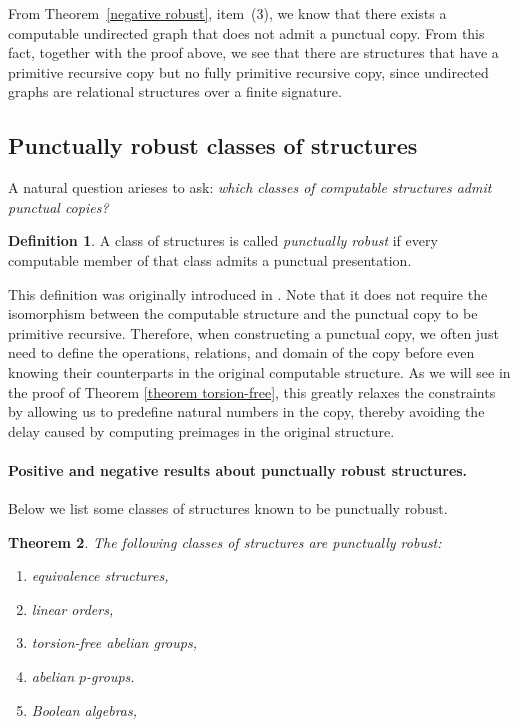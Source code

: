 \documentclass{pracalicmgr2025}
\theoremstyle{plain}            %
\newtheorem{theorem}{Theorem}[chapter]
\theoremstyle{remark}           %
\theoremstyle{definition}       %
\newtheorem{definition}[theorem]{Definition}
\begin{document}
From Theorem~\ref{negative robust}, item~(3), we know that there exists a computable undirected graph that does not admit a punctual copy. From this fact, together with the proof above, we see that there are structures that have a primitive recursive copy but no fully primitive recursive copy, since undirected graphs are relational structures over a finite signature.



\subsection{Punctually robust classes of structures}

A natural question arieses to ask: \emph{which classes of computable structures admit punctual copies?}
\begin{definition}
A class of structures is called \textit{punctually robust} if every computable member of that class admits a punctual presentation.
\end{definition}
This definition was originally introduced in \cite{kalocinski_et_al:LIPIcs.MFCS.2024.65}. Note that it does not require the isomorphism between the computable structure and the punctual copy to be primitive recursive. Therefore, when constructing a punctual copy, we often just need to define the operations, relations, and domain of the copy before even knowing their counterparts in the original computable structure. As we will see in the proof of Theorem \ref{theorem torsion-free}, this greatly relaxes the constraints by allowing us to predefine natural numbers in the copy, thereby avoiding the delay caused by computing preimages in the original structure.



\newpage
\paragraph{Positive and negative results about punctually robust structures.}
Below we list some classes of structures known to be punctually robust. 



\begin{theorem}\cite{3}\label{positive robust}
The following classes of structures are punctually robust:
\begin{enumerate}[noitemsep, topsep=0pt]
    \item equivalence structures,
    \item linear orders,
    \item torsion-free abelian groups,
    \item abelian $p$-groups.
    \item Boolean algebras,
    \end{enumerate}
\end{theorem}
\bigskip
\end{document}
